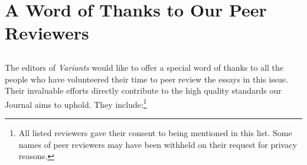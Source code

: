 \pagestyle{authors}
\chapter*{A Word of Thanks to Our Peer Reviewers}
\protect\thispagestyle{chaptertitlepage}


\section*{}
The editors of \emph{Variants} would like to offer a special word of thanks to all the people who have volunteered their time to peer review the essays in this issue. Their invaluable efforts directly contribute to the high quality standards our Journal aims to uphold. They include:\footnote{All listed reviewers gave their consent to being mentioned in this list. Some names of peer reviewers may have been withheld on their request for privacy reasons.} 

